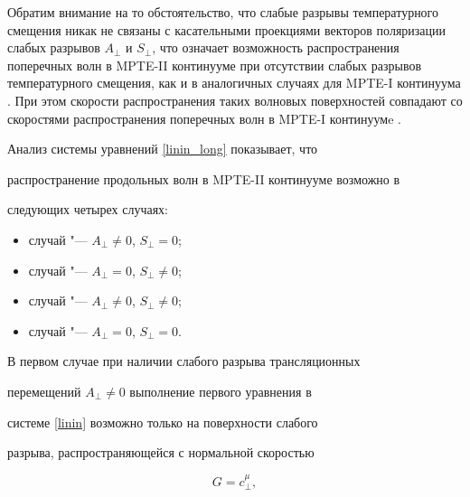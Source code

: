 Обратим внимание на то обстоятельство, что слабые разрывы температурного смещения никак не связаны с касательными проекциями векторов поляризации слабых разрывов $A_{\perp}$ и $S_{\perp}$, что означает возможность распространения поперечных волн в MPTE-II континууме при отсутствии слабых разрывов температурного смещения, как и в аналогичных случаях для MPTE-I континуума \cite{MurashkinRadayev:bib:MurashkinRadayev2014}. При этом скорости распространения таких волновых поверхностей совпадают со скоростями распространения поперечных волн в MPTE-I континуумe \cite{MurashkinRadayev:bib:MurashkinRadayev2014, MurashkinRadayev:bib:Nowacki}.



Анализ системы уравнений \eqref{linin_long} показывает, что

распространение продольных волн в MPTE-II континууме возможно в

следующих четырех случаях:



\begin{itemize}



\item[\rm I] случай "--- $A_\perp  \ne 0$, $S_{\perp}  = 0$;



\item[\rm II] случай "--- $A_\perp  = 0$, $S_{\perp}  \ne 0$;



\item[\rm III] случай "--- $A_\perp  \ne 0$, $S_{\perp}  \ne 0$;



\item[\rm IV] случай "--- $A_\perp  = 0$, $S_{\perp}  = 0$.





\end{itemize}



В первом случае при наличии слабого разрыва трансляционных

перемещений $A_{\perp} \ne 0$ выполнение первого уравнения в

системе \eqref{linin} возможно только на поверхности слабого

разрыва, распространяющейся с нормальной скоростью

\begin{equation}\label{G3}

G =c^{\mu}_{\perp},

\end{equation}

